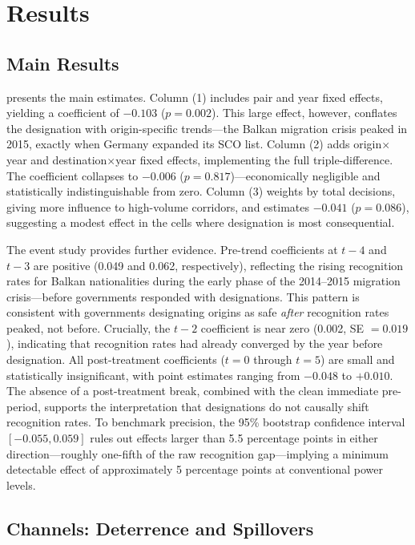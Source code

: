 \documentclass[12pt]{article}
\begin{document}
\section{Results}

\subsection{Main Results}

 presents the main estimates. Column (1) includes pair and year fixed effects, yielding a coefficient of $-0.103$ ($p = 0.002$). This large effect, however, conflates the designation with origin-specific trends---the Balkan migration crisis peaked in 2015, exactly when Germany expanded its SCO list. Column (2) adds origin$\times$year and destination$\times$year fixed effects, implementing the full triple-difference. The coefficient collapses to $-0.006$ ($p = 0.817$)---economically negligible and statistically indistinguishable from zero. Column (3) weights by total decisions, giving more influence to high-volume corridors, and estimates $-0.041$ ($p = 0.086$), suggesting a modest effect in the cells where designation is most consequential.



The event study provides further evidence. Pre-trend coefficients at $t-4$ and $t-3$ are positive (0.049 and 0.062, respectively), reflecting the rising recognition rates for Balkan nationalities during the early phase of the 2014--2015 migration crisis---before governments responded with designations. This pattern is consistent with governments designating origins as safe \textit{after} recognition rates peaked, not before. Crucially, the $t-2$ coefficient is near zero (0.002, SE $= 0.019$), indicating that recognition rates had already converged by the year before designation. All post-treatment coefficients ($t = 0$ through $t = 5$) are small and statistically insignificant, with point estimates ranging from $-0.048$ to $+0.010$. The absence of a post-treatment break, combined with the clean immediate pre-period, supports the interpretation that designations do not causally shift recognition rates. To benchmark precision, the 95\% bootstrap confidence interval $[-0.055, 0.059]$ rules out effects larger than 5.5 percentage points in either direction---roughly one-fifth of the raw recognition gap---implying a minimum detectable effect of approximately 5 percentage points at conventional power levels.

\subsection{Channels: Deterrence and Spillovers}
\end{document}
